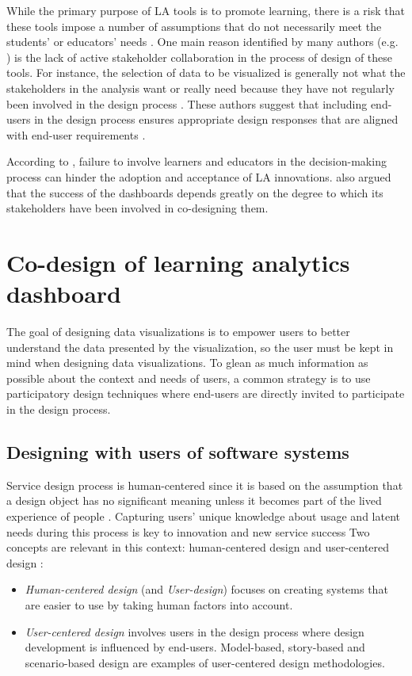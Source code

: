 \documentclass[manuscript,nonacm,12pt]{acmart}
\begin{document}
While the primary purpose of LA tools is to promote learning, there is a risk that these tools impose a number of assumptions that do not necessarily meet the students' or educators' needs \cite{dawson2015challenging}. One main reason identified by many authors (e.g. \cite{buckingham2019human}) is the lack of active stakeholder collaboration in the process of design of these tools. 
For instance, the selection of data to be visualized is generally not what the stakeholders in the analysis want or really need because they have not regularly been involved in the design process \citep{Holstein2017}.
These authors suggest that including end-users in the design process ensures appropriate design responses that are aligned with end-user requirements \cite{taffe2015hybrid}. 

According to \citet{beattie2014creepy}, failure to involve learners and educators in the decision-making process can hinder the adoption and acceptance of LA innovations. \citet{Holstein2017} also argued that the success of the dashboards depends greatly on the degree to which its stakeholders have been involved in co-designing them. 

\section{Co-design of learning analytics dashboard}
The goal of designing data visualizations is to empower users to better understand the data presented by the visualization, so the user must be kept in mind when designing data visualizations. 
To glean as much information as possible about the context and needs of users, 
a common strategy is to use participatory design techniques where end-users are directly invited to participate in the design process. 

\subsection{Designing with users of software systems}
Service design process is human-centered since it is based on the assumption that a design object has no significant meaning unless it becomes part of the lived experience of people \cite{krippendorff2005semantic}.
Capturing users' unique knowledge about usage and latent needs during this process  is key to innovation and new service success \cite{mahr2014value}
Two concepts are relevant in this context: human-centered design and user-centered design :
\begin{itemize}
    \item \textit{Human-centered design} (and \textit{User-design}) focuses on creating systems that are easier to use by taking human factors into account.
    \item \textit{User-centered design} involves users in the design process where design development is influenced by end-users. Model-based, story-based and scenario-based design are examples of user-centered design methodologies. 
\end{itemize}
\end{document}
